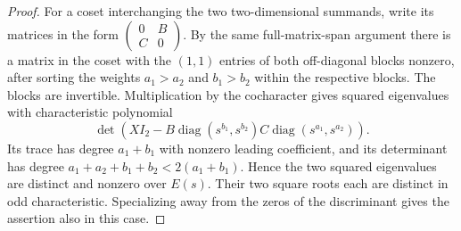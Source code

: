 \begin{proof}
For a coset interchanging the two two-dimensional summands,
write its matrices in the form
$\left(\begin{smallmatrix}0&B\\C&0\end{smallmatrix}\right)$.
By the same full-matrix-span argument there is a matrix in
the coset with the $(1,1)$ entries of both off-diagonal blocks
nonzero, after sorting the weights $a_1>a_2$ and $b_1>b_2$
within the respective blocks. The blocks are invertible.
Multiplication by the cocharacter gives squared eigenvalues
with characteristic polynomial
\[
 \det(XI_2-B\operatorname{diag}(s^{b_1},s^{b_2})
                C\operatorname{diag}(s^{a_1},s^{a_2})).
\]
Its trace has degree $a_1+b_1$ with nonzero leading
coefficient, and its determinant has degree
$a_1+a_2+b_1+b_2<2(a_1+b_1)$. Hence the two squared
eigenvalues are distinct and nonzero over $E(s)$.
Their two square roots each are distinct in odd
characteristic. Specializing away from the zeros of the
discriminant gives the assertion also in this case.
\end{proof}

